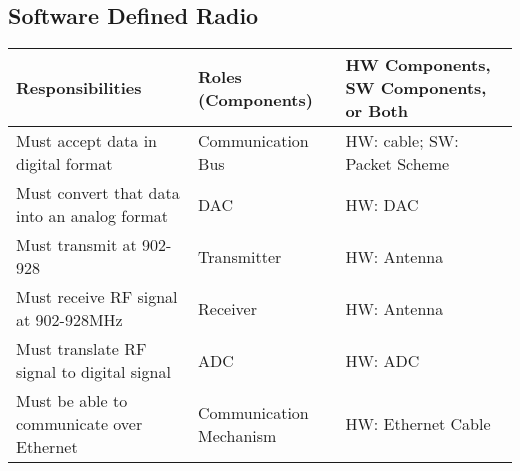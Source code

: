 \documentclass[RRC.tex]{subfiles}
\begin{document}
\bigskip

\subsection{\Large Software Defined Radio}
\begin{center}
	\begin{tabular}{ | p{5cm} | p{5cm} | p{5cm} |}
		\hline
		Responsibilities & Roles (Components) & HW Components, SW Components, or Both \\ \hline
		Must accept data in digital format & Communication Bus & HW: cable; SW: Packet Scheme \\ \hline
		Must convert that data into an analog format & DAC & HW: DAC  \\ \hline
		Must transmit at 902-928 & Transmitter & HW: Antenna \\ \hline
		Must receive RF signal at 902-928MHz & Receiver & HW: Antenna \\ \hline
		Must translate RF signal to digital signal & ADC & HW: ADC \\ \hline
		Must be able to communicate over Ethernet & Communication Mechanism & HW: Ethernet Cable \\ \hline
	\end{tabular}
\end{center}
\end{document}
